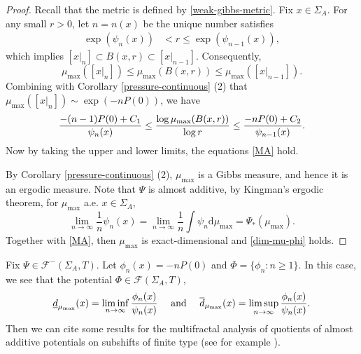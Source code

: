 \documentclass[reqno,11pt,graphicx,]{amsart}
\numberwithin{equation}{section}
\theoremstyle{plain}
\newcommand{\3}{\mathbf{3}}
\newcommand{\mw}{x}
\begin{document}
	\begin{proof}
		Recall that the metric is defined by \eqref{weak-gibbs-metric}. Fix $\mw\in\Sigma_A$. For any small $r>0$, let $n=n(x)$ be the unique number satisfies 
		\begin{align*}
			\exp(\psi_{n}(\mw))&<r\leq\exp(\psi_{n-1}(\mw)),
		\end{align*}
		which implies $[\mw|_{n}]\subset B(\mw,r)\subset[\mw|_{n-1}]$. Consequently, 
		\begin{equation*}
			\mu_{\max}([\mw|_{n}])\leq \mu_{\max}(B(\mw%
			,r))\leq\mu_{\max}([\mw|_{n-1}]).
		\end{equation*}
		Combining with Corollary \ref{pressure-continuous} (2) that $\mu_{\max}([\mw|_n])\sim\exp(-nP(0))$, we have
		\begin{equation*}
			\frac{-(n-1)P(0)+C_1}{\psi_{n}(\mw)}\leq\frac{\log\mu_{\max}(B(\mw,r))}{\log r}\leq\frac{-nP(0)+C_2}{%
				\psi_{n-1}(\mw)}.
		\end{equation*}
		Now by taking the
		upper and lower limits, the equations \eqref{MA} hold.
		
		By Corollary \ref{pressure-continuous} (2), $\mu_{\max}$ is a Gibbs measure, and hence it is an ergodic measure. Note that $\Psi$ is almost additive, by Kingman's ergodic theorem, for $\mu_{\max}$ a.e. $x\in\Sigma_A$, 
		\begin{equation*}
			\lim\limits_{n\to\infty}\frac{1}{n}\psi_n(x)=\lim\limits_{n\to\infty}
\frac{1}{n}\int\psi_n\mathrm{d}\mu_{\max}=\Psi_*(\mu_{\max}).
		\end{equation*}
		Together with \eqref{MA}, then $\mu_{\max}$ is exact-dimensional and \eqref{dim-mu-phi} holds.
	\end{proof}
	
	Fix $\Psi\in\mathcal{F}^{-}(\Sigma_{A},T)$.	Let $\phi_n(x)=-nP(0)$ and $\Phi=\{\phi_n:n\geq1\}$. In this case,  we see that the potential $\Phi\in\mathcal{F}(\Sigma_{A},T)$, 
	\begin{equation*}
		\underline{d}_{\mu_{\max}}(\mw)=\liminf\limits_{n\to\infty}\frac{\phi_n(x)}{%
			\psi_{n}(\mw)}\ \ \ \ \text{and}\ \ \ \ \overline{d}_{\mu_{\max}}(\mw)= \limsup\limits_{n\to\infty}\frac{\phi_n(x)}{%
			\psi_{n}(\mw)}.
	\end{equation*}
	Then we can cite some results for the multifractal analysis of quotients of almost additive potentials on subshifts of finite type (see for example \cite{BQ2012,FH2010}).
	
\end{document}
